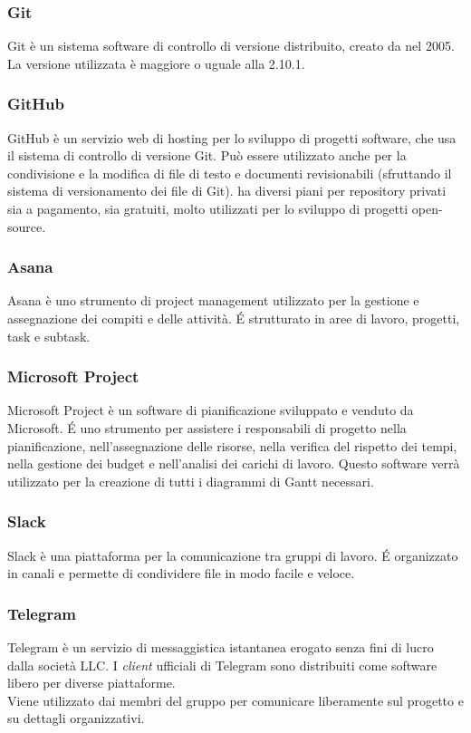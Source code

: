 \subsubsection{Git} 
Git è un sistema software di controllo di versione distribuito, creato da  nel 2005. La versione utilizzata è maggiore o uguale alla 2.10.1.

\subsubsection{GitHub}
GitHub è un servizio web di hosting per lo sviluppo di progetti
software, che usa il sistema di controllo di versione Git. Può essere
utilizzato anche per la condivisione e la modifica di file di testo e
documenti revisionabili (sfruttando il sistema di versionamento dei
file di Git).  ha diversi piani per repository privati sia a
pagamento, sia gratuiti, molto utilizzati per lo sviluppo di progetti
open-source. 

\subsubsection{Asana}
Asana è uno strumento di project management utilizzato per la gestione e assegnazione dei compiti e delle attività. \'E strutturato in aree di lavoro, progetti, task e subtask. 

\subsubsection{Microsoft Project}

Microsoft Project è un software di pianificazione sviluppato e venduto
da Microsoft. \'E uno strumento per assistere i responsabili di progetto
nella pianificazione, nell'assegnazione delle risorse, nella verifica
del rispetto dei tempi, nella gestione dei budget e nell'analisi dei
carichi di lavoro. Questo software verrà utilizzato 
per la creazione di tutti i diagrammi di Gantt necessari. 

\subsubsection{Slack}
Slack è una piattaforma per la comunicazione tra gruppi di lavoro. É
organizzato in canali e permette di condividere file in modo facile e veloce.

\subsubsection{Telegram}
Telegram è un servizio di messaggistica istantanea erogato senza fini
di lucro dalla società  LLC. I \emph{client} ufficiali di
Telegram sono distribuiti come software libero per diverse
piattaforme.\\Viene utilizzato dai membri del gruppo per comunicare
liberamente sul progetto e su dettagli organizzativi. 

